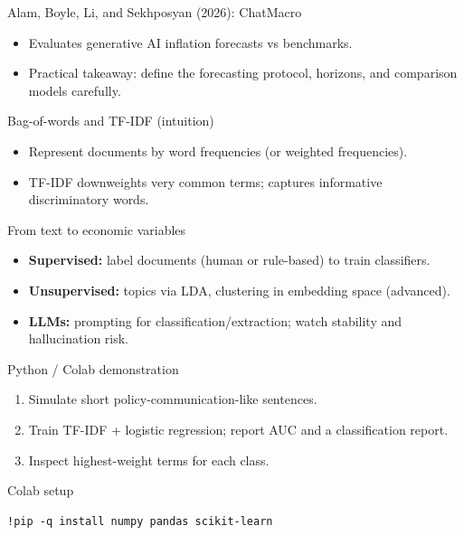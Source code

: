 \documentclass[aspectratio=169,11pt]{beamer}
\begin{document}
\begin{frame}{Alam, Boyle, Li, and Sekhposyan (2026): ChatMacro}
  \begin{itemize}
    \item Evaluates generative AI inflation forecasts vs benchmarks.
    \item Practical takeaway: define the forecasting protocol, horizons, and comparison models carefully.
  \end{itemize}
\end{frame}

\begin{frame}{Bag-of-words and TF-IDF (intuition)}
  \begin{itemize}
    \item Represent documents by word frequencies (or weighted frequencies).
    \item TF-IDF downweights very common terms; captures informative discriminatory words.
  \end{itemize}
\end{frame}

\begin{frame}{From text to economic variables}
  \begin{itemize}
    \item \textbf{Supervised:} label documents (human or rule-based) to train classifiers.
    \item \textbf{Unsupervised:} topics via LDA, clustering in embedding space (advanced).
    \item \textbf{LLMs:} prompting for classification/extraction; watch stability and hallucination risk.
  \end{itemize}
\end{frame}

\begin{frame}{Python / Colab demonstration}
  \begin{enumerate}
    \item Simulate short policy-communication-like sentences.
    \item Train TF-IDF + logistic regression; report AUC and a classification report.
    \item Inspect highest-weight terms for each class.
  \end{enumerate}
\end{frame}

\begin{frame}[fragile]{Colab setup}
  \begin{verbatim}
!pip -q install numpy pandas scikit-learn
  \end{verbatim}
\end{frame}
\end{document}
